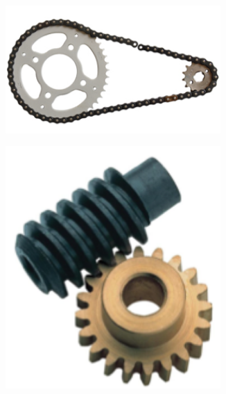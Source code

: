 \documentclass[10pt,fleqn]{article} %
\begin{document}
\begin{figure}[h]
\begin{subfigure}{.25\textwidth}
    \caption{}
  \end{subfigure}\hfill
  \begin{subfigure}{0.25\textwidth}
    \centering
    \includegraphics[width=0.9\textwidth,height=.1\textheight,keepaspectratio]{images/pignon_chaine}
    \caption{}
  \end{subfigure}\hfill
  \begin{subfigure}{.25\textwidth}
    \centering
    \includegraphics[width=0.9\textwidth,height=.1\textheight,keepaspectratio]{images/roue_vis}
    \caption{}
  \end{subfigure}\\

\end{figure}
\end{document}
